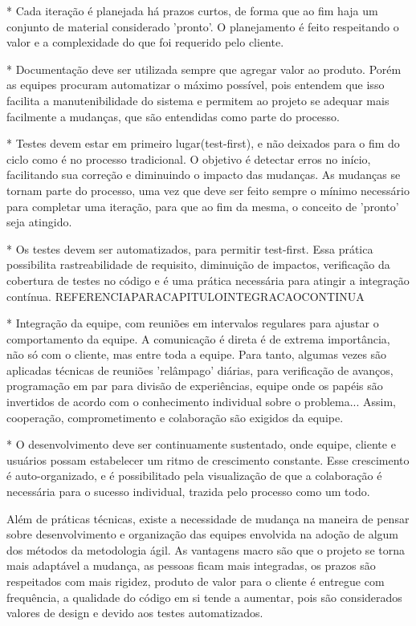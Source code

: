 \documentclass[a4paper,11pt,abntfigtabnum,noindentfirst]{abnt}
\begin{document}
    * Cada iteração é planejada há prazos curtos, de forma que ao fim haja um conjunto de material considerado 'pronto'. O planejamento é feito respeitando o valor e a complexidade do que foi requerido pelo cliente.

    * Documentação deve ser utilizada sempre que agregar valor ao produto. Porém as equipes procuram automatizar o máximo possível, pois entendem que isso facilita a manutenibilidade do sistema e permitem ao projeto se adequar mais facilmente a mudanças, que são entendidas como parte do processo.

    * Testes devem estar em primeiro lugar(test-first), e não deixados para o fim do ciclo como é no processo tradicional. O objetivo é detectar erros no início, facilitando sua correção e diminuindo o impacto das mudanças. As mudanças se tornam parte do processo, uma vez que deve ser feito sempre o mínimo necessário para completar uma iteração, para que ao fim da mesma, o conceito de 'pronto' seja atingido.

    * Os testes devem ser automatizados, para permitir test-first. Essa prática possibilita rastreabilidade de requisito, diminuição de impactos, verificação da cobertura de testes no código e é uma prática necessária para atingir a integração contínua. REFERENCIAPARACAPITULOINTEGRACAOCONTINUA

    * Integração da equipe, com reuniões em intervalos regulares para ajustar o comportamento da equipe. A comunicação é direta é de extrema importância, não só com o cliente, mas entre toda a equipe. Para tanto, algumas vezes são aplicadas técnicas de reuniões 'relâmpago' diárias, para verificação de avanços, programação em par para divisão de experiências, equipe onde os papéis são invertidos de acordo com o conhecimento individual sobre o problema... Assim, cooperação, comprometimento e colaboração são exigidos da equipe. 

    * O desenvolvimento deve ser continuamente sustentado, onde equipe, cliente e usuários possam estabelecer um ritmo de crescimento constante. Esse crescimento é auto-organizado, e é possibilitado pela visualização de que a colaboração é necessária para o sucesso individual, trazida pelo processo como um todo.

Além de práticas técnicas, existe a necessidade de mudança na maneira de pensar sobre desenvolvimento e organização das equipes envolvida na adoção de algum dos métodos da metodologia ágil. As vantagens macro são que o projeto se torna mais adaptável a mudança, as pessoas ficam mais integradas, os prazos são respeitados com mais rigidez, produto de valor para o cliente é entregue com frequência, a qualidade do código em si tende a aumentar, pois são considerados valores de design e devido aos testes automatizados.
\end{document}
